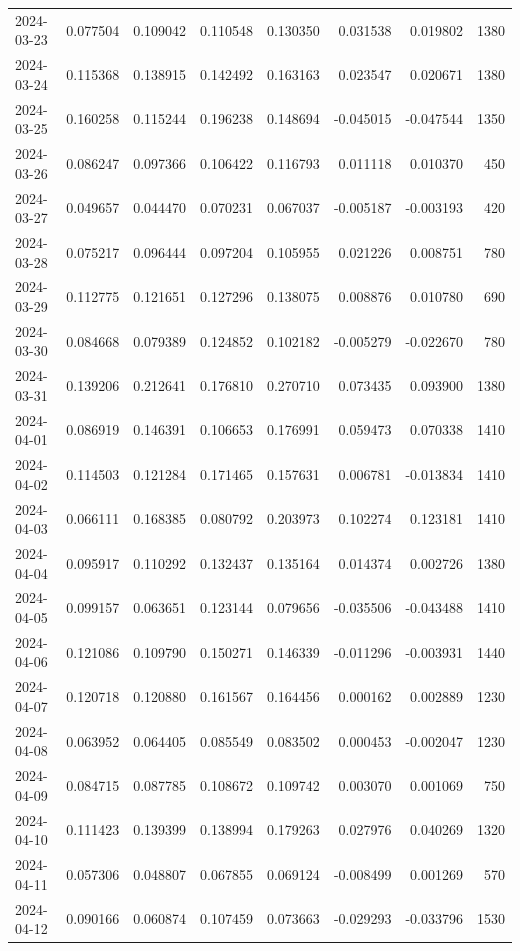 \begin{tabular}{lrrrrrrr}
2024-03-23 & 0.077504 & 0.109042 & 0.110548 & 0.130350 & 0.031538 & 0.019802 & 1380 \\
2024-03-24 & 0.115368 & 0.138915 & 0.142492 & 0.163163 & 0.023547 & 0.020671 & 1380 \\
2024-03-25 & 0.160258 & 0.115244 & 0.196238 & 0.148694 & -0.045015 & -0.047544 & 1350 \\
2024-03-26 & 0.086247 & 0.097366 & 0.106422 & 0.116793 & 0.011118 & 0.010370 & 450 \\
2024-03-27 & 0.049657 & 0.044470 & 0.070231 & 0.067037 & -0.005187 & -0.003193 & 420 \\
2024-03-28 & 0.075217 & 0.096444 & 0.097204 & 0.105955 & 0.021226 & 0.008751 & 780 \\
2024-03-29 & 0.112775 & 0.121651 & 0.127296 & 0.138075 & 0.008876 & 0.010780 & 690 \\
2024-03-30 & 0.084668 & 0.079389 & 0.124852 & 0.102182 & -0.005279 & -0.022670 & 780 \\
2024-03-31 & 0.139206 & 0.212641 & 0.176810 & 0.270710 & 0.073435 & 0.093900 & 1380 \\
2024-04-01 & 0.086919 & 0.146391 & 0.106653 & 0.176991 & 0.059473 & 0.070338 & 1410 \\
2024-04-02 & 0.114503 & 0.121284 & 0.171465 & 0.157631 & 0.006781 & -0.013834 & 1410 \\
2024-04-03 & 0.066111 & 0.168385 & 0.080792 & 0.203973 & 0.102274 & 0.123181 & 1410 \\
2024-04-04 & 0.095917 & 0.110292 & 0.132437 & 0.135164 & 0.014374 & 0.002726 & 1380 \\
2024-04-05 & 0.099157 & 0.063651 & 0.123144 & 0.079656 & -0.035506 & -0.043488 & 1410 \\
2024-04-06 & 0.121086 & 0.109790 & 0.150271 & 0.146339 & -0.011296 & -0.003931 & 1440 \\
2024-04-07 & 0.120718 & 0.120880 & 0.161567 & 0.164456 & 0.000162 & 0.002889 & 1230 \\
2024-04-08 & 0.063952 & 0.064405 & 0.085549 & 0.083502 & 0.000453 & -0.002047 & 1230 \\
2024-04-09 & 0.084715 & 0.087785 & 0.108672 & 0.109742 & 0.003070 & 0.001069 & 750 \\
2024-04-10 & 0.111423 & 0.139399 & 0.138994 & 0.179263 & 0.027976 & 0.040269 & 1320 \\
2024-04-11 & 0.057306 & 0.048807 & 0.067855 & 0.069124 & -0.008499 & 0.001269 & 570 \\
2024-04-12 & 0.090166 & 0.060874 & 0.107459 & 0.073663 & -0.029293 & -0.033796 & 1530 \\

\end{tabular}
